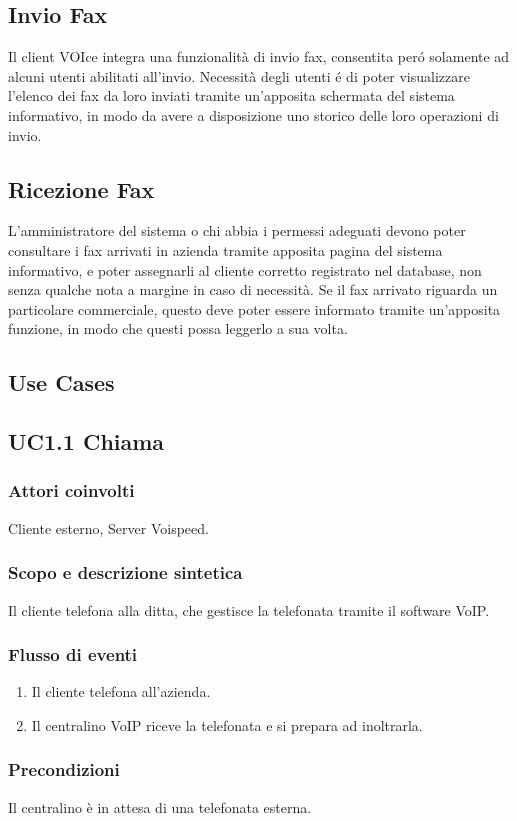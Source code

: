 \subsection{Invio Fax}
Il client VOIce integra una funzionalit\`a di invio fax, consentita per\'o solamente ad alcuni utenti abilitati all'invio. Necessit\`a degli utenti \'e di poter visualizzare l'elenco dei fax da loro inviati tramite un'apposita schermata del sistema informativo, in modo da avere a disposizione uno storico delle loro operazioni di invio.
\subsection{Ricezione Fax}
L'amministratore del sistema o chi abbia i permessi adeguati devono poter consultare i fax arrivati in azienda tramite apposita pagina del sistema informativo, e poter assegnarli al cliente corretto registrato nel database, non senza qualche nota a margine in caso di necessit\`a. Se il fax arrivato riguarda un particolare commerciale, questo deve poter essere informato tramite un'apposita funzione, in modo che questi possa leggerlo a sua volta.
\subsection{Use Cases}
\subsection*{UC1.1 Chiama}
\subsubsection*{Attori coinvolti} Cliente esterno, Server Voispeed.
\subsubsection*{Scopo e descrizione sintetica}
Il cliente telefona alla ditta, che gestisce la telefonata tramite il software VoIP.
\subsubsection*{Flusso di eventi}
\begin{enumerate}
\item Il cliente telefona all'azienda.
\item Il centralino VoIP riceve la telefonata e si prepara ad inoltrarla.
\end{enumerate}
\subsubsection*{Precondizioni}  Il centralino \` e in attesa di una telefonata esterna.
